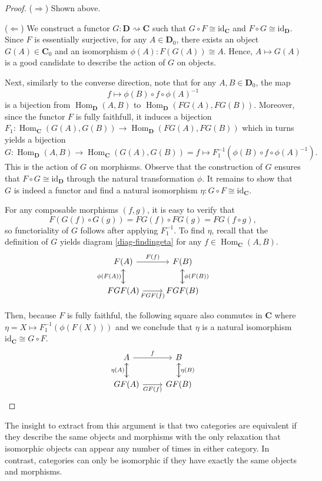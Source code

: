 \documentclass{article}
\theoremstyle{definition}
\theoremstyle{remark}
\DeclareMathOperator{\Hom}{Hom}
\newcommand{\id}{\text{id}}
\begin{document}
\begin{proof}
	($\Rightarrow$) Shown above.
	
	($\Leftarrow$) We construct a functor $G:\mathbf{D}\rightsquigarrow \mathbf{C}$ such that $G\circ F \cong \id_{\mathbf{C}}$ and $F\circ G \cong \id_{\mathbf{D}}$. Since $F$ is essentially surjective, for any $A \in \mathbf{D}_0$, there exists an object $G(A) \in \mathbf{C}_0$ and an isomorphism $\phi(A):F(G(A)) \cong A$. Hence, $A \mapsto G(A)$ is a good candidate to describe the action of $G$ on objects.
	
	Next, similarly to the converse direction, note that for any $A,B \in \mathbf{D}_0$, the map 
	\[f\mapsto \phi(B) \circ f \circ \phi(A)^{-1}\]
	is a bijection from $\Hom_{\mathbf{D}}(A,B)$ to $\Hom_{\mathbf{D}}(FG(A), FG(B))$. Moreover, since the functor $F$ is fully faithfull, it induces a bijection $F_1: \Hom_{\mathbf{C}}(G(A), G(B)) \rightarrow \Hom_{\mathbf{D}}(FG(A), FG(B))$ which in turns yields a bijection 
	\[G: \Hom_{\mathbf{D}}(A,B) \rightarrow \Hom_{\mathbf{C}}(G(A), G(B)) = f \mapsto F_1^{-1}(\phi(B) \circ f \circ \phi(A)^{-1}).\]
	This is the action of $G$ on morphisms. Observe that the construction of $G$ ensures that $F\circ G \cong \id_{\mathbf{D}}$ through the natural transformation $\phi$. It remains to show that $G$ is indeed a functor and find a natural isomorphism $\eta:G\circ F \cong \id_{\mathbf{C}}$.
	
	For any composable morphisms $(f,g)$, it is easy to verify that 
	\[F(G(f)\circ G(g)) = FG(f) \circ FG(g) = FG(f \circ g),\]
	so functoriality of $G$ follows after applying $F_1^{-1}$. To find $\eta$, recall that the definition of $G$ yields diagram \eqref{diag-findingeta} for any $f\in \Hom_{\mathbf{C}}(A,B)$.
	\begin{equation}\label{diag-findingeta}
		\begin{tikzcd}
	F(A) \arrow[d] \arrow[r, "F(f)"]                    & F(B) \arrow[d]                  \\
	FGF(A) \arrow[u, "\phi(F(A))"] \arrow[r, "FGF(f)"'] & FGF(B) \arrow[u, "\phi(F(B))"']
	\end{tikzcd}
	\end{equation}
	
	Then, because $F$ is fully faithful, the following square also commutes in $\mathbf{C}$ where $\eta = X \mapsto F_1^{-1}(\phi(F(X)))$ and we conclude that $\eta$ is a natural isomorphism $\id_{\mathbf{C}} \cong G\circ F$.
	\begin{equation}\label{diag-foundeta}
	\begin{tikzcd}
	A \arrow[d] \arrow[r, "f"]                     & B \arrow[d]                 \\
	GF(A) \arrow[u, "\eta(A)"] \arrow[r, "GF(f)"'] & GF(B) \arrow[u, "\eta(B)"']
	\end{tikzcd}
	\end{equation}
\end{proof}
The insight to extract from this argument is that two categories are equivalent if they describe the same objects and morphisms with the only relaxation that isomorphic objects can appear any number of times in either category. In contrast, categories can only be isomorphic if they have exactly the same objects and morphisms.
\end{document}
